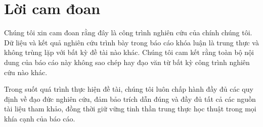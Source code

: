 \chapter*{Lời cam đoan}
\label{commitment}

Chúng tôi xin cam đoan rằng đây là công trình nghiên cứu của chính chúng tôi. Dữ liệu và kết quả nghiên cứu trình bày trong báo cáo khóa luận là trung thực và không trùng lặp với bất kỳ đề tài nào khác. Chúng tôi cam kết rằng toàn bộ nội dung của báo cáo này không sao chép hay đạo văn từ bất kỳ công trình nghiên cứu nào khác.

Trong suốt quá trình thực hiện đề tài, chúng tôi luôn chấp hành đầy đủ các quy định về đạo đức nghiên cứu, đảm bảo trích dẫn đúng và đầy đủ tất cả các nguồn tài liệu tham khảo, đồng thời giữ vững tinh thần trung thực học thuật trong mọi khía cạnh của báo cáo.
